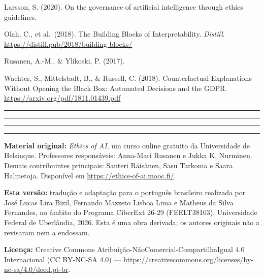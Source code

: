 \documentclass[
  11pt,
]{article}
\newcommand{\faixaEixos}[1][\linewidth]{%
  \noindent
  \textcolor{iaConceitos}{\rule{0.3333#1}{4pt}}%
  \textcolor{iaAplic}{\rule{0.3333#1}{4pt}}%
  \textcolor{iaRiscos}{\rule{0.3333#1}{4pt}}%
  \par}
\newenvironment{licenca}
  {\par\vspace{2em}\faixaEixos\par\vspace{0.8em}
   \begingroup\sffamily\scriptsize\color{iaTintaFraca}}
  {\endgroup\par}
\begin{document}
Larsson, S. (2020). On the governance of artificial intelligence through
ethics guidelines.

Olah, C., et al.~(2018). The Building Blocks of Interpretability.
\emph{Distill}. \url{https://distill.pub/2018/building-blocks/}

Rusanen, A.-M., \& Ylikoski, P. (2017).

Wachter, S., Mittelstadt, B., \& Russell, C. (2018). Counterfactual
Explanations Without Opening the Black Box: Automated Decisions and the
GDPR. \url{https://arxiv.org/pdf/1811.01439.pdf}

\begin{center}\rule{0.5\linewidth}{0.5pt}\end{center}

\begin{licenca}

\textbf{Material original:} \emph{Ethics of AI}, um curso online
gratuito da Universidade de Helsinque. Professores responsáveis:
Anna-Mari Rusanen e Jukka K. Nurminen. Demais contribuintes principais:
Santeri Räisänen, Sasu Tarkoma e Saara Halmetoja. Disponível em
\url{https://ethics-of-ai.mooc.fi/}.

\textbf{Esta versão:} tradução e adaptação para o português brasileiro
realizada por José Lucas Lira Bizil, Fernando Mazzeto Lisboa Lima e
Matheus da Silva Fernandes, no âmbito do Programa CiberExt 26-29
(FEELT38103), Universidade Federal de Uberlândia, 2026. Esta é uma obra
derivada; os autores originais não a revisaram nem a endossam.

\textbf{Licença:} Creative Commons
Atribuição-NãoComercial-CompartilhaIgual 4.0 Internacional (CC BY-NC-SA
4.0) ---
\url{https://creativecommons.org/licenses/by-nc-sa/4.0/deed.pt-br}.

\end{licenca}
\end{document}
